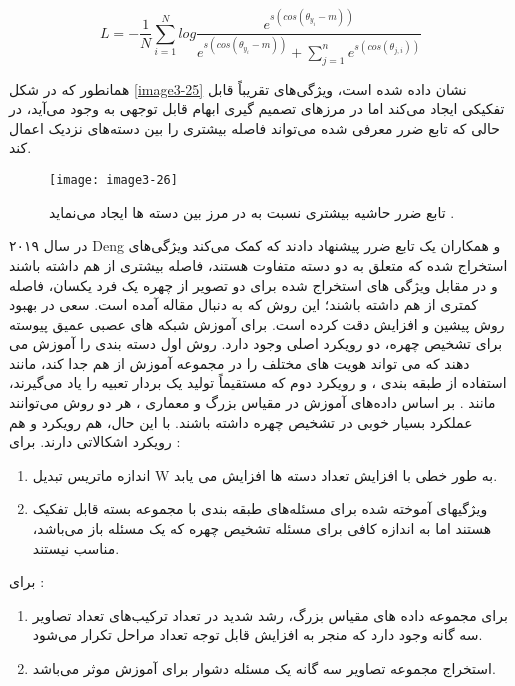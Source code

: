 \begin{equation}
\label{eq3-13}
L = - \frac{1}{N} \sum_{i=1}^{N} log \frac{e^{s(cos(\theta_{y_i}-m))}}{e^{s(cos(\theta_{y_i}-m))} + \sum_{j=1}^{n} e^{s(cos(\theta_{j, i}))}}
\end{equation}

\noindent
همانطور که در شکل \ref{image3-25} نشان داده شده است،  ویژگی‌های تقریباً قابل تفکیکی ایجاد می‌کند اما در مرزهای تصمیم گیری ابهام قابل توجهی به وجود می‌آید، در حالی که تابع ضرر معرفی شده می‌تواند فاصله بیشتری را بین دسته‌های نزدیک اعمال کند.

\begin{figure}[h]
\centering
  \texttt{[image: image3-26]}
  \caption{تابع ضرر  حاشیه بیشتری نسبت به  در مرز بین دسته ها ایجاد می‌نماید \cite{wang2018cosface}.}
  \label{image3-26}
\end{figure}

\noindent
در سال ۲۰۱۹ Deng و همکاران \cite{deng2019arcface} یک تابع ضرر پیشنهاد دادند که کمک می‌کند ویژگی‌های استخراج شده که متعلق به دو دسته متفاوت هستند، فاصله بیشتری از هم داشته باشند و در مقابل ویژگی های استخراج شده برای دو تصویر از چهره یک فرد یکسان، فاصله کمتری از هم داشته باشند؛ این روش که به دنبال مقاله \cite{wang2018cosface} آمده است. سعی در بهبود روش پیشین و افزایش دقت کرده است. برای آموزش شبکه های عصبی عمیق پیوسته برای تشخیص چهره، دو رویکرد اصلی وجود دارد. روش اول دسته بندی را آموزش می دهند که می تواند هویت های مختلف را در مجموعه آموزش از هم جدا کند، مانند استفاده از طبقه بندی ، و رویکرد دوم که مستقیماً تولید یک بردار تعبیه  را یاد می‌گیرند، مانند . بر اساس داده‌های آموزش در مقیاس بزرگ و معماری ، هر دو روش می‌توانند عملکرد بسیار خوبی در تشخیص چهره داشته باشند. با این حال، هم رویکرد  و هم رویکرد  اشکالاتی دارند.
\noindent
برای :
\begin{enumerate}
\item
	اندازه ماتریس تبدیل W به طور خطی با افزایش تعداد دسته ها  افزایش می یابد.‌
\item 
ویژگیهای آموخته شده برای مسئله‌های طبقه بندی با مجموعه بسته قابل تفکیک هستند اما به اندازه کافی برای مسئله تشخیص چهره که یک مسئله باز می‌باشد، مناسب نیستند. 
\end{enumerate}

\noindent
برای :
\begin{enumerate}
\item
 برای مجموعه داده های مقیاس بزرگ، رشد شدید در تعداد ترکیب‌های تعداد تصاویر سه گانه وجود دارد که منجر به افزایش قابل توجه تعداد مراحل تکرار می‌شود.
\item 
 استخراج مجموعه تصاویر سه گانه یک مسئله دشوار برای آموزش موثر می‌باشد. 
\end{enumerate}

